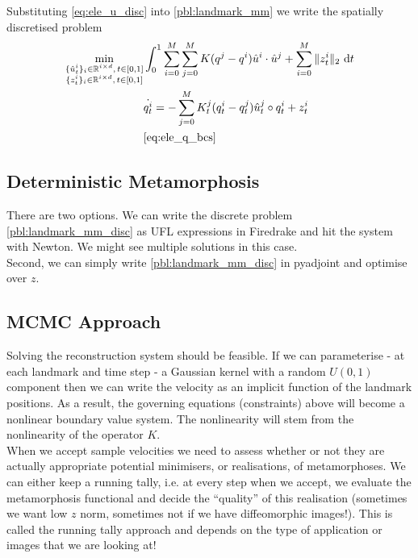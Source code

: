 \documentclass{article}
\newcommand{\norm}[2]{\| #1 \|_{ #2 }}
\newcommand{\ltwonorm}[1]{\norm{ #1 }{2}}
\newcommand{\diff}[1]{\text{d} #1}
\begin{document}
Substituting \eqref{eq:ele_u_disc} into
\eqref{pbl:landmark_mm} we write the spatially discretised problem
\begin{subequations}\label{pbl:landmark_mm_disc}
\begin{align}
\min_{\substack{\{\hat u^i_t\}_i \in \mathbb{R}^{i\times d},\, t\in[0,1]\\
\{z^i_t\}_i \in \mathbb{R}^{i\times d},\, t\in[0,1]}} & \int_0^1 \sum_{i=0}^M \sum_{j=0}^M K(q^j-q^i)\hat u^i \cdot\hat u^j+ \sum_{i=0}^M \ltwonorm{z^i_t} \diff{t}\\
            & \dot{q^i_t} = - \sum_{j=0}^M K^j_t(q^i_t-q^j_t)\hat u^j_t \circ q^i_t + z^i_t \label{eq:ele_q_disc} \\
            & \eqref{eq:ele_q_bcs}\nonumber
\end{align}
\end{subequations}

\subsection{Deterministic Metamorphosis}

There are two options. We can write the discrete problem
\eqref{pbl:landmark_mm_disc} as UFL expressions in Firedrake and hit the system
with Newton. We might see multiple solutions in this case.\\

Second, we can simply write \eqref{pbl:landmark_mm_disc} in pyadjoint and optimise
over $z$.

\subsection{MCMC Approach}

Solving the reconstruction system should be feasible.  If we can parameterise -
at each landmark and time step - a Gaussian kernel with a random $U(0,1)$
component then we can write the velocity as an implicit function of the landmark
positions. As a result, the governing equations (constraints) above will become
a nonlinear boundary value system. The nonlinearity will stem from the
nonlinearity of the operator $K$.\\

When we accept sample velocities we need to
assess whether or not they are actually appropriate potential minimisers, or
realisations, of metamorphoses. We can either keep a running tally, i.e. at
every step when we accept, we evaluate the metamorphosis functional and decide
the ``quality'' of this realisation (sometimes we want low $z$ norm, sometimes
not if we have diffeomorphic images!). This is called the running tally
approach and depends on the type of application or images that we are looking
at!




\end{document}
